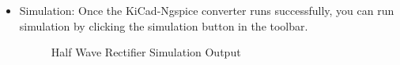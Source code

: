 \begin{itemize}
\item Simulation: Once the KiCad-Ngspice converter runs successfully, you can run simulation by clicking the simulation button in the toolbar.
\begin{figure}[!htp]
    \centering
     \hfill
    \caption{Half Wave Rectifier Simulation Output}
\end{figure}


\end{itemize}

\pagebreak



